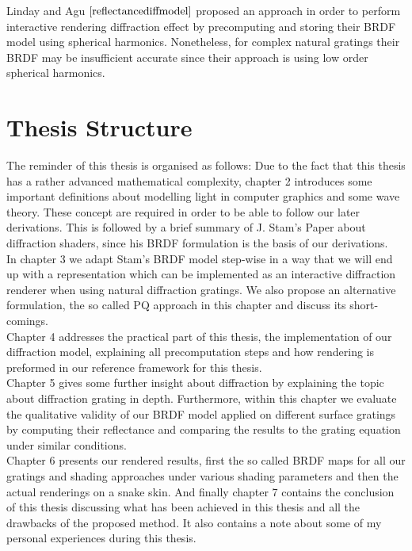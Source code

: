 Linday and Agu $\cite{reflectancediffmodel}$ proposed an approach in order to perform interactive rendering diffraction effect by precomputing and storing their BRDF model using spherical harmonics. Nonetheless, for complex natural gratings their BRDF may be insufficient accurate since their approach is using low order spherical harmonics.

\section{Thesis Structure}
The reminder of this thesis is organised as follows: Due to the fact that this thesis has a rather advanced mathematical complexity, chapter 2 introduces some important definitions about modelling light in computer graphics and some wave theory. These concept are required in order to be able to follow our later derivations. This is followed by a brief summary of J. Stam's Paper about diffraction shaders, since his BRDF formulation is the basis of our derivations. \\

In chapter 3 we adapt Stam's BRDF model step-wise in a way that we will end up with a representation which can be implemented as an interactive diffraction renderer when using natural diffraction gratings. We also propose an alternative formulation, the so called PQ approach in this chapter and discuss its short-comings. \\

Chapter 4 addresses the practical part of this thesis, the implementation of our diffraction model, explaining all precomputation steps and how rendering is preformed in our reference framework for this thesis. \\

Chapter 5 gives some further insight about diffraction by explaining the topic about diffraction grating in depth. Furthermore, within this chapter we evaluate the qualitative validity of our BRDF model applied on different surface gratings by computing their reflectance and comparing the results to the grating equation under similar conditions. \\

Chapter 6 presents our rendered results, first the so called BRDF maps for all our gratings and shading approaches under various shading parameters and then the actual renderings on a snake skin. And finally chapter 7 contains the conclusion of this thesis discussing what has been achieved in this thesis and all the drawbacks of the proposed method. It also contains a note about some of my personal experiences during this thesis.
